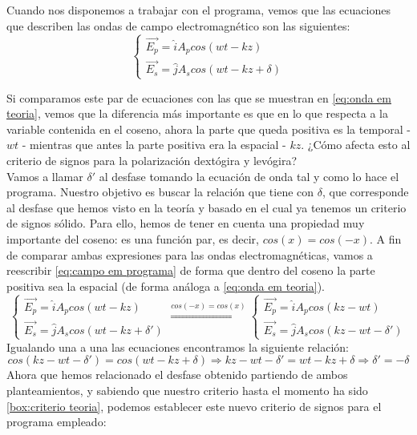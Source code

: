 \documentclass[11pt]{article}
\begin{document}
    \noindent Cuando nos disponemos a trabajar con el programa, vemos que las ecuaciones que describen las ondas de campo electromagnético son las siguientes:
    \begin{equation}
    \left\{ \begin{array}{lr} \Vec{E_p} = \hat{i}A_{p} cos(wt-kz) \\
    \Vec{E_s} = \hat{j}A_{s} cos(wt-kz+\delta)  \end{array} \right.
    \end{equation}\label{eq:campo em programa}
    
    \noindent Si comparamos este par de ecuaciones con las que se muestran en \ref{eq:onda em teoria}, vemos que la diferencia más importante es que en lo que respecta a la variable contenida en el coseno, ahora la parte que queda positiva es la temporal - $wt$ - mientras que antes la parte positiva era la espacial - $kz$.
    ¿Cómo afecta esto al criterio de signos para la polarización dextógira y levógira? \\

    \noindent Vamos a llamar $\delta '$ al desfase tomando la ecuación de onda tal y como lo hace el programa. Nuestro objetivo es buscar la relación que tiene con $\delta$, que corresponde al desfase que hemos visto en la teoría y basado en el cual ya tenemos un criterio de signos sólido. Para ello, hemos de tener en cuenta una propiedad muy importante del coseno: es una función par, es decir, $cos(x) = cos(-x)$. A fin de comparar ambas expresiones para las ondas electromagnéticas, vamos a reescribir \ref{eq:campo em programa} de forma que dentro del coseno la parte positiva sea la espacial (de forma análoga a \ref{eq:onda em teoria}).
    \begin{equation*}
    \left\{ \begin{array}{lr} \Vec{E_p} = \hat{i}A_{p} cos(wt-kz) \\
    \Vec{E_s} = \hat{j}A_{s} cos(wt-kz+\delta ')  \end{array} \right. \stackrel{cos(-x) = cos(x)}{\Longrightarrow} 
    \left\{ \begin{array}{lr} \Vec{E_p} = \hat{i}A_{p} cos(kz-wt) \\
    \Vec{E_s} = \hat{j}A_{s} cos(kz-wt-\delta ')  \end{array} \right.
    \end{equation*}
    \noindent Igualando una a una las ecuaciones encontramos la siguiente relación:
    \begin{equation}
        cos(kz-wt-\delta ') = cos(wt-kz+\delta) \Longrightarrow kz-wt-\delta ' = wt-kz+\delta \Longrightarrow \delta ' = - \delta
    \end{equation}
    \noindent Ahora que hemos relacionado el desfase obtenido partiendo de ambos planteamientos, y sabiendo que nuestro criterio hasta el momento ha sido \ref{box:criterio teoria}, podemos establecer este nuevo criterio de signos para el programa empleado:\\
    
\end{document}
